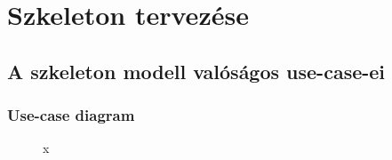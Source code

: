%
\chapter{Szkeleton tervezése}

\thispagestyle{fancy}

\section{A szkeleton modell valóságos use-case-ei}

\subsection{Use-case diagram}

\begin{figure}[h]
\begin{center}
\caption{x}
\label{fig:SzkeletonUseCase}
\end{center}
\end{figure}

